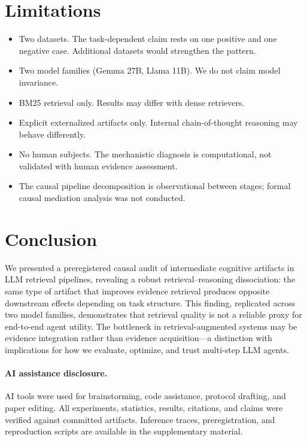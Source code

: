 \documentclass{article}
\begin{document}
\section{Limitations}
\label{sec:limitations}

\begin{itemize}
    \item Two datasets. The task-dependent claim rests on one positive and one negative case. Additional datasets would strengthen the pattern.
    \item Two model families (Gemma 27B, Llama 11B). We do not claim model invariance.
    \item BM25 retrieval only. Results may differ with dense retrievers.
    \item Explicit externalized artifacts only. Internal chain-of-thought reasoning may behave differently.
    \item No human subjects. The mechanistic diagnosis is computational, not validated with human evidence assessment.
    \item The causal pipeline decomposition is observational between stages; formal causal mediation analysis was not conducted.
\end{itemize}

\section{Conclusion}

We presented a preregistered causal audit of intermediate cognitive artifacts in LLM retrieval pipelines, revealing a robust retrieval--reasoning dissociation: the same type of artifact that improves evidence retrieval produces opposite downstream effects depending on task structure. This finding, replicated across two model families, demonstrates that retrieval quality is not a reliable proxy for end-to-end agent utility. The bottleneck in retrieval-augmented systems may be evidence integration rather than evidence acquisition---a distinction with implications for how we evaluate, optimize, and trust multi-step LLM agents.

\paragraph{AI assistance disclosure.}
AI tools were used for brainstorming, code assistance, protocol drafting, and paper editing. All experiments, statistics, results, citations, and claims were verified against committed artifacts. Inference traces, preregistration, and reproduction scripts are available in the supplementary material.



\end{document}
